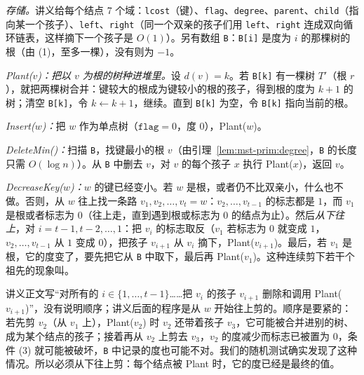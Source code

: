 \emph{存储。}讲义给每个结点 7 个域：\texttt{lcost}（键）、\texttt{flag}、\texttt{degree}、\texttt{parent}、\texttt{child}（指向某一个孩子）、\texttt{left}、\texttt{right}（同一个双亲的孩子们用 \texttt{left}、\texttt{right} 连成双向循环链表，这样摘下一个孩子是 $O(1)$）。另有数组 \texttt{B}：\texttt{B[i]} 是度为 $i$ 的那棵树的根（由 (1)，至多一棵），没有则为 $-1$。


\emph{Plant($v$)：把以 $v$ 为根的树种进堆里。}设 $d(v)=k$。若 \texttt{B[k]} 有一棵树 $T'$（根 $r$），就把两棵树合并：键较大的根成为键较小的根的孩子，得到根的度为 $k+1$ 的树；清空 \texttt{B[k]}，令 $k\gets k+1$，继续。直到 \texttt{B[k]} 为空，令 \texttt{B[k]} 指向当前的根。

\emph{Insert($w$)：}把 $w$ 作为单点树（$\texttt{flag}=0$，度 $0$），Plant($w$)。

\emph{DeleteMin()：}扫描 \texttt{B}，找键最小的根 $v$（由引理~\ref{lem:mst-prim:degree}，\texttt{B} 的长度只需 $O(\log n)$）。从 \texttt{B} 中删去 $v$，对 $v$ 的每个孩子 $x$ 执行 Plant($x$)，返回 $v$。

\emph{DecreaseKey($w$)：}$w$ 的键已经变小。若 $w$ 是根，或者仍不比双亲小，什么也不做。否则，从 $w$ 往上找一条路 $v_1,v_2,\dots,v_t=w$：$v_2,\dots,v_{t-1}$ 的标志都是 $1$，而 $v_1$ 是根或者标志为 $0$（往上走，直到遇到根或标志为 $0$ 的结点为止）。然后\emph{从下往上}，对 $i=t-1,t-2,\dots,1$：把 $v_i$ 的标志取反（$v_1$ 若标志为 $0$ 就变成 $1$，$v_2,\dots,v_{t-1}$ 从 $1$ 变成 $0$），把孩子 $v_{i+1}$ 从 $v_i$ 摘下，Plant($v_{i+1}$)。最后，若 $v_1$ 是根，它的度变了，要先把它从 \texttt{B} 中取下，最后再 Plant($v_1$)。这种连续剪下若干个祖先的现象叫。

\begin{remark}[剪切的顺序]
讲义正文写“对所有的 $i\in\{1,\dots,t-1\}$……把 $v_i$ 的孩子 $v_{i+1}$ 删除和调用 Plant($v_{i+1}$)”，没有说明顺序；讲义后面的程序是从 $w$ 开始往上剪的。顺序是要紧的：若先剪 $v_2$（从 $v_1$ 上），Plant($v_2$) 时 $v_2$ 还带着孩子 $v_3$，它可能被合并进别的树、成为某个结点的孩子；接着再从 $v_2$ 上剪去 $v_3$，$v_2$ 的度减少而标志已被置为 $0$，条件 (3) 就可能被破坏，\texttt{B} 中记录的度也可能不对。我们的随机测试确实发现了这种情况。所以必须从下往上剪：每个结点被 Plant 时，它的度已经是最终的值。
\end{remark}


